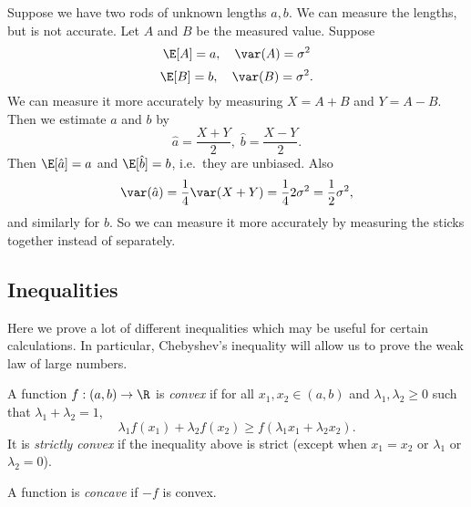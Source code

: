 \documentclass[a4paper]{article}
\begin{document}
\begin{eg}
  Suppose we have two rods of unknown lengths $a, b$. We can measure the lengths, but is not accurate. Let $A$ and $B$ be the measured value. Suppose
  \[
    \E[A] = a,\quad \var(A) = \sigma^2
  \]
  \[
    \E[B] = b, \quad \var(B) = \sigma^2.
  \]
  We can measure it more accurately by measuring $X = A + B$ and $Y = A - B$. Then we estimate $a$ and $b$ by
  \[
    \hat{a} = \frac{X + Y}{2},\; \hat{b} = \frac{X - Y}{2}.
  \]
  Then $\E[\hat{a}] = a$ and $\E[\hat{b}] = b$, i.e.\ they are unbiased. Also
  \[
    \var (\hat{a}) = \frac{1}{4}\var(X + Y) = \frac{1}{4}2\sigma^2 = \frac{1}{2}\sigma^2,
  \]
  and similarly for $b$. So we can measure it more accurately by measuring the sticks together instead of separately.
\end{eg}

\subsection{Inequalities}
Here we prove a lot of different inequalities which may be useful for certain calculations. In particular, Chebyshev's inequality will allow us to prove the weak law of large numbers.

\begin{defi}
  A function $f: (a, b) \to \R$ is \emph{convex} if for all $x_1, x_2\in (a, b)$ and $\lambda_1, \lambda_2 \geq 0$ such that $\lambda_1 + \lambda_2 = 1$,\[
    \lambda_1f(x_1) + \lambda_2 f(x_2) \geq f(\lambda_1x_1 + \lambda_2 x_2).
  \]
  It is \emph{strictly convex} if the inequality above is strict (except when $x_1 = x_2$ or $\lambda_1$ or $\lambda_2 = 0$).
  \begin{center}
  \end{center}
  A function is \emph{concave} if $-f$ is convex.
\end{defi}
\end{document}
